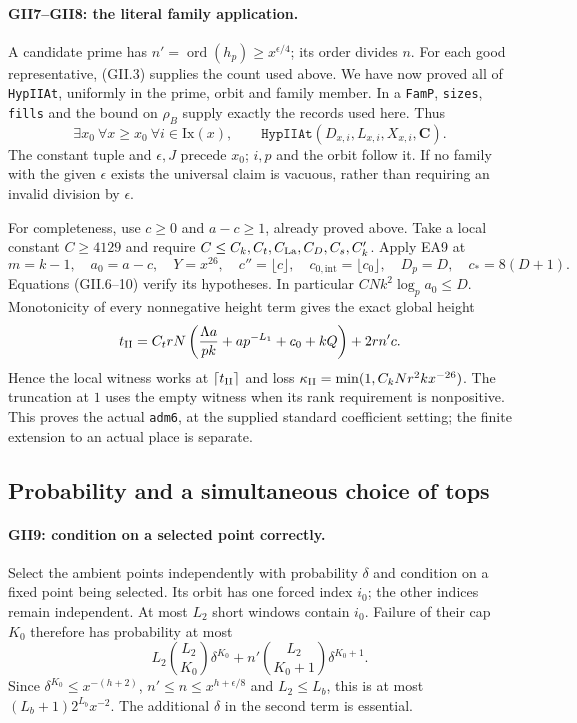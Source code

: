 \paragraph{GII7--GII8: the literal family application.}
A candidate prime has $n'=\operatorname{ord}(h_p)\ge x^{\epsilon/4}$;
its order divides $n$. For each good representative, (GII.3) supplies
the count used above. We have now proved all of \texttt{HypIIAt},
uniformly in the prime, orbit and family member. In a \texttt{FamP},
\texttt{sizes}, \texttt{fills} and the bound on $\rho_B$ supply exactly
the records used here. Thus
\[
 \exists x_0\ \forall x\ge x_0\ \forall i\in\mathrm{Ix}(x),
 \qquad\texttt{HypIIAt}(D_{x,i},L_{x,i},X_{x,i},\mathbf C).
 \tag{GII.11}
\]
The constant tuple and $\epsilon,J$ precede $x_0$; $i,p$ and the orbit
follow it. If no family with the given $\epsilon$ exists the universal
claim is vacuous, rather than requiring an invalid division by $\epsilon$.

For completeness, use $c\ge0$ and $a-c\ge1$, already proved above.
Take a local constant $C\ge4129$ and require
$C\le C_k,C_t,C_{\rm La},C_D,C_s,C_k'$. Apply EA9 at
\[
 m=k-1,\quad a_0=a-c,\quad Y=x^{26},\quad
 c''=\lfloor c\rfloor,\quad c_{0,\mathrm{int}}=\lfloor c_0\rfloor,
 \quad D_p=D,\quad c_*=8(D+1).
\]
Equations (GII.6--10) verify its hypotheses. In particular
$CNk^2\log_pa_0\le D$. Monotonicity of every nonnegative height term
gives the exact global height
\[
 t_{\rm II}=C_t rN\left(\frac{\Lambda a}{pk}+ap^{-L_1}+c_0+kQ\right)+2rn'c.
\]
Hence the local witness works at $\lceil t_{\rm II}\rceil$ and loss
$\kappa_{\rm II}=\min(1,C_kNr^2kx^{-26})$. The truncation at $1$ uses
the empty witness when its rank requirement is nonpositive. This proves
the actual \texttt{adm6}, at the supplied standard coefficient setting;
the finite extension to an actual place is separate.

\subsection{Probability and a simultaneous choice of tops}

\paragraph{GII9: condition on a selected point correctly.}
Select the ambient points independently with probability $\delta$ and
condition on a fixed point being selected. Its orbit has one forced
index $i_0$; the other indices remain independent. At most $L_2$ short
windows contain $i_0$. Failure of their cap $K_0$ therefore has probability
at most
\[
 L_2\binom{L_2}{K_0}\delta^{K_0}
 +n'\binom{L_2}{K_0+1}\delta^{K_0+1}.
\]
Since $\delta^{K_0}\le x^{-(h+2)}$, $n'\le n\le x^{h+\epsilon/8}$
and $L_2\le L_b$, this is at most $(L_b+1)2^{L_b}x^{-2}$.
The additional $\delta$ in the second term is essential.

